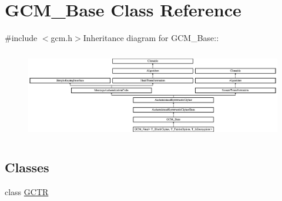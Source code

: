 \hypertarget{class_g_c_m___base}{
\section{GCM\_\-Base Class Reference}
\label{class_g_c_m___base}
}


 


{\ttfamily \#include $<$gcm.h$>$}Inheritance diagram for GCM\_\-Base::\begin{figure}[H]
\begin{center}
\leavevmode
\includegraphics[height=3.91951cm]{class_g_c_m___base}
\end{center}
\end{figure}
\subsection*{Classes}
\begin{DoxyCompactItemize}
\item 
class \hyperlink{class_g_c_m___base_1_1_g_c_t_r}{GCTR}
\end{DoxyCompactItemize}

